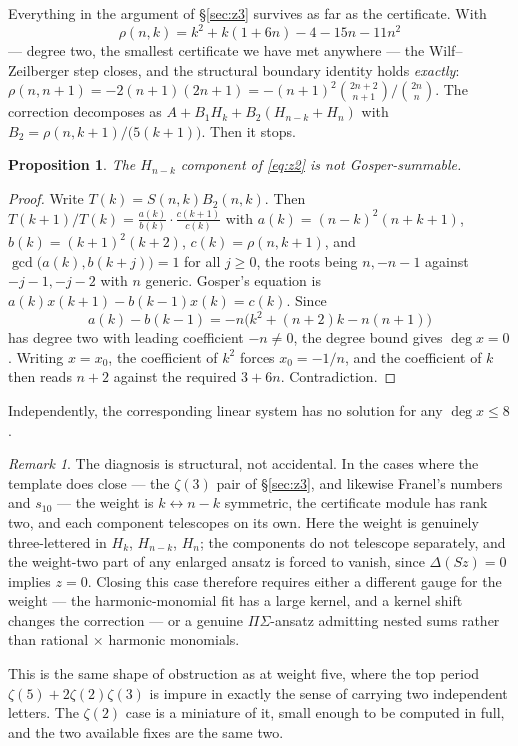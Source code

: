\documentclass[11pt,a4paper]{amsart}
\theoremstyle{plain}
\newtheorem{proposition}[theorem]{Proposition}
\theoremstyle{definition}
\theoremstyle{remark}
\newtheorem{remark}[theorem]{Remark}
\begin{document}
Everything in the argument of \S\ref{sec:z3} survives as far as the certificate. With
\[
  \rho(n,k)=k^2+k(1+6n)-4-15n-11n^2
\]
--- degree two, the smallest certificate we have met anywhere --- the Wilf--Zeilberger step
closes, and the structural boundary identity holds \emph{exactly}:
$\rho(n,n+1)=-2(n+1)(2n+1)=-(n+1)^2\binom{2n+2}{n+1}\big/\binom{2n}{n}$. The correction
decomposes as $A+B_1H_k+B_2(H_{n-k}+H_n)$ with $B_2=\rho(n,k+1)/\bigl(5(k+1)\bigr)$. Then it
stops.

\begin{proposition}\label{prop:z2}
The $H_{n-k}$ component of \eqref{eq:z2} is not Gosper-summable.
\end{proposition}

\begin{proof}
Write $T(k)=S(n,k)B_2(n,k)$. Then $T(k+1)/T(k)=\frac{a(k)}{b(k)}\cdot\frac{c(k+1)}{c(k)}$ with
$a(k)=(n-k)^2(n+k+1)$, $b(k)=(k+1)^2(k+2)$, $c(k)=\rho(n,k+1)$, and
$\gcd\bigl(a(k),b(k+j)\bigr)=1$ for all $j\ge0$, the roots being $n,-n-1$ against $-j-1,-j-2$
with $n$ generic. Gosper's equation is $a(k)x(k+1)-b(k-1)x(k)=c(k)$. Since
\[
  a(k)-b(k-1)=-n\bigl(k^2+(n+2)k-n(n+1)\bigr)
\]
has degree two with leading coefficient $-n\ne0$, the degree bound gives $\deg x=0$. Writing
$x=x_0$, the coefficient of $k^2$ forces $x_0=-1/n$, and the coefficient of $k$ then reads
$n+2$ against the required $3+6n$. Contradiction.
\end{proof}

Independently, the corresponding linear system has no solution for any $\deg x\le8$.

\begin{remark}\label{rem:z2}
The diagnosis is structural, not accidental. In the cases where the template does close --- the
$\zeta(3)$ pair of \S\ref{sec:z3}, and likewise Franel's numbers and $s_{10}$ --- the weight is
$k\leftrightarrow n-k$ symmetric, the certificate module has rank two, and each component
telescopes on its own. Here the weight is genuinely three-lettered in $H_k$, $H_{n-k}$, $H_n$;
the components do not telescope separately, and the weight-two part of any enlarged ansatz is
forced to vanish, since $\Delta(Sz)=0$ implies $z=0$. Closing this case therefore requires
either a different gauge for the weight --- the harmonic-monomial fit has a large kernel, and a
kernel shift changes the correction --- or a genuine $\Pi\Sigma$-ansatz admitting nested sums
rather than rational $\times$ harmonic monomials.

This is the same shape of obstruction as at weight five, where the top period
$\zeta(5)+2\zeta(2)\zeta(3)$ is impure in exactly the sense of carrying two independent letters.
The $\zeta(2)$ case is a miniature of it, small enough to be computed in full, and the two
available fixes are the same two.
\end{remark}
\end{document}
